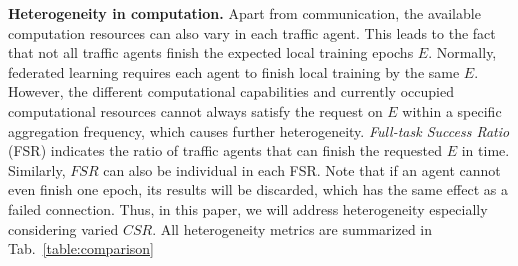 \noindent \textbf{Heterogeneity in computation.} 
Apart from communication, the available computation resources can also vary in each traffic agent. This leads to the fact that not all traffic agents finish the expected local training epochs $E$. Normally, federated learning requires each agent to finish local training by the same $E$. However, the different computational capabilities and currently occupied computational resources cannot always satisfy the request on $E$ within a specific aggregation frequency, which causes further heterogeneity. %
\emph{Full-task Success Ratio} (FSR) indicates the ratio of traffic agents that can finish the requested $E$ in time. Similarly, $FSR$ can also be individual in each FSR. Note that if an agent cannot even finish one epoch, its results will be discarded, which has the same effect as a failed connection. Thus, in this paper, we will address heterogeneity especially considering varied $CSR$. All heterogeneity metrics are summarized in Tab.~\ref{table:comparison}
